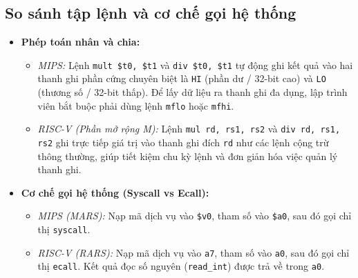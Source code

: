 \documentclass[12pt,a4paper]{article}
\begin{document}
\subsection{So sánh tập lệnh và cơ chế gọi hệ thống}
\begin{itemize}
    \item \textbf{Phép toán nhân và chia:}
    \begin{itemize}
        \item \textit{MIPS:} Lệnh \texttt{mult \$t0, \$t1} và \texttt{div \$t0, \$t1} tự động ghi kết quả vào hai thanh ghi phần cứng chuyên biệt là \texttt{HI} (phần dư / 32-bit cao) và \texttt{LO} (thương số / 32-bit thấp). Để lấy dữ liệu ra thanh ghi đa dụng, lập trình viên bắt buộc phải dùng lệnh \texttt{mflo} hoặc \texttt{mfhi}.
        \item \textit{RISC-V (Phần mở rộng M):} Lệnh \texttt{mul rd, rs1, rs2} và \texttt{div rd, rs1, rs2} ghi trực tiếp giá trị vào thanh ghi đích \texttt{rd} như các lệnh cộng trừ thông thường, giúp tiết kiệm chu kỳ lệnh và đơn giản hóa việc quản lý thanh ghi.
    \end{itemize}
    \item \textbf{Cơ chế gọi hệ thống (Syscall vs Ecall):}
    \begin{itemize}
        \item \textit{MIPS (MARS):} Nạp mã dịch vụ vào \texttt{\$v0}, tham số vào \texttt{\$a0}, sau đó gọi chỉ thị \texttt{syscall}.
        \item \textit{RISC-V (RARS):} Nạp mã dịch vụ vào \texttt{a7}, tham số vào \texttt{a0}, sau đó gọi chỉ thị \texttt{ecall}. Kết quả đọc số nguyên (\texttt{read\_int}) được trả về trong \texttt{a0}.
    \end{itemize}
\end{itemize}
\end{document}
